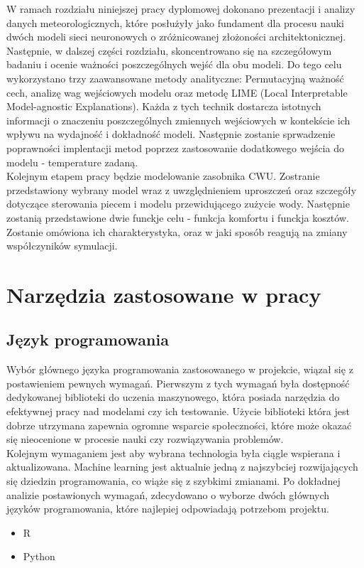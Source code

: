 \documentclass[a4paper,twoside,12pt]{book}
\begin{document}
W ramach rozdziału  niniejszej pracy dyplomowej dokonano prezentacji i analizy danych meteorologicznych, które posłużyły jako fundament dla procesu nauki dwóch modeli sieci neuronowych o zróżnicowanej złożoności architektonicznej. Następnie, w dalszej części rozdziału, skoncentrowano się na szczegółowym badaniu i ocenie ważności poszczególnych wejść dla obu modeli. Do tego celu wykorzystano trzy zaawansowane metody analityczne: Permutacyjną ważność cech, analizę wag wejściowych modelu oraz metodę LIME (Local Interpretable Model-agnostic Explanations). Każda z tych technik dostarcza istotnych informacji o znaczeniu poszczególnych zmiennych wejściowych w kontekście ich wpływu na wydajność i dokładność modeli. Następnie zostanie sprwadzenie poprawności implentacji metod poprzez zastosowanie dodatkowego wejścia do modelu - temperature zadaną.\\

Kolejnym etapem pracy będzie modelowanie zasobnika CWU. Zostranie przedstawiony wybrany model wraz z uwzględnieniem uproszczeń oraz szczegóły dotyczące sterowania piecem i modelu przewidującego zużycie wody. Następnie zostanią przedstawione dwie funckje celu - funkcja komfortu i funckja kosztów. Zostanie omówiona ich charakterystyka, oraz w jaki sposób reagują na zmiany współczyników symulacji.
\newpage



\chapter{Narzędzia zastosowane w pracy}
\label{ch:wymagania-i-narzedzia}
\section{Język programowania}
Wybór głównego języka programowania zastosowanego w projekcie, wiązał się z postawieniem pewnych wymagań. Pierwszym z tych wymagań była dostępność dedykowanej biblioteki do uczenia maszynowego, która posiada narzędzia do efektywnej pracy nad modelami czy ich testowanie. Użycie biblioteki która jest dobrze utrzymana zapewnia ogromne wsparcie społeczności, które może okazać się nieocenione w procesie nauki czy rozwiązywania problemów.\\
Kolejnym wymaganiem jest aby wybrana technologia była ciągle wspierana i aktualizowana. Machine learning jest aktualnie jedną z najszybciej rozwijających się dziedzin programowania, co wiąże się z szybkimi zmianami. Po dokładnej analizie postawionych wymagań, zdecydowano o wyborze dwóch głównych języków programowania, które najlepiej odpowiadają potrzebom projektu.
\begin{itemize}
  \item R
  \item Python
\end{itemize}
\end{document}
